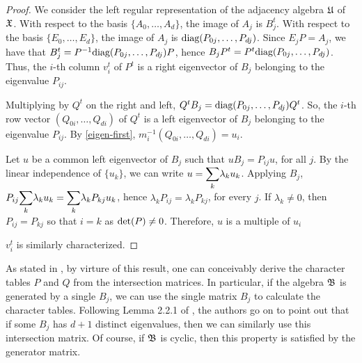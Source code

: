 \documentclass[../../../main]{subfiles}
\begin{document}
 \begin{proof}
  We consider the left regular representation of the adjacency algebra $\mathfrak{U}$ of $\mathfrak{X}$. With respect to the basis $\{A_0, \dots, A_d\}$, the image of $A_j$ is $B_j^t$. With respect to the basis $\{E_0, \dots, E_d\}$, the image of $A_j$ is $\text{diag}(P_{0j}, \dots, P_{dj})$. Since $E_jP=A_j$, we have that $B_j^t = P^{-1}\text{diag}(P_{0j}, \dots, P_{dj})P$, hence $B_jP^t=P^t\text{diag}(P_{0j}, \dots, P_{dj})$.  Thus, the $i$-th column $v_i^t$ of $P^t$ is a right eigenvector of $B_j$ belonging to the eigenvalue $P_{ij}$.
  
  Multiplying by $Q^t$ on the right and left, $Q^tB_j=\text{diag}(P_{0j}, \dots, P_{dj})Q^t$. So, the $i$-th row vector $(Q_{0i}, \dots, Q_{di})$ of $Q^t$ is a left eigenvector of $B_j$ belonging to the eigenvalue $P_{ij}$. By \ref{eigen-first}, $m_i^{-1}(Q_{0i}, \dots, Q_{di})=u_i$.
  
  Let $u$ be a common left eigenvector of $B_j$ such that $uB_j=P_{ij}u$, for all $j$. By the linear independence of $\{u_k\}$, we can write $u=\ssum_k\lambda_ku_k$. Applying $B_j$, $P_{ij}\ssum_k\lambda_ku_k=\ssum_k\lambda_kP_{kj}u_k$, hence $\lambda_kP_{ij}=\lambda_kP_{kj}$, for every $j$. If $\lambda_k \neq 0$, then $P_{ij}=P_{kj}$ so that $i=k$ as $\text{det}(P) \neq 0$. Therefore, $u$ is a multiple of $u_i$
  
  $v_i^t$ is similarly characterized.
 \end{proof}
 
 As stated in \cite{bannaialgebraic}, by virture of this result, one can conceivably derive the character tables $P$ and $Q$ from the intersection matrices. In particular, if the algebra $\mathfrak{B}$ is generated by a single $B_j$, we can use the single matrix $B_j$ to calculate the character tables. Following Lemma 2.2.1 of \cite{distance-regular-graphs}, the authors go on to point out that if some $B_j$ has $d+1$ distinct eigenvalues, then we can similarly use this intersection matrix. Of course, if $\mathfrak{B}$ is cyclic, then this property is satisfied by the generator matrix.
\end{document}
